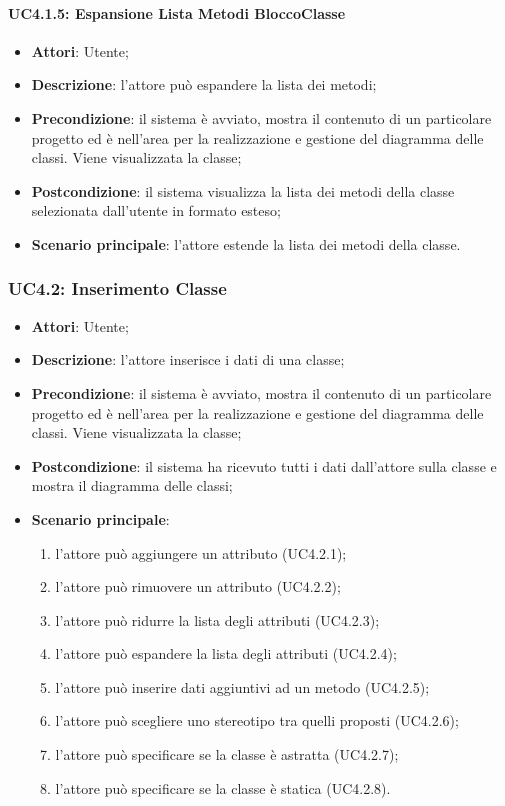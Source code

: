 \paragraph{UC4.1.5: Espansione Lista Metodi BloccoClasse}
\label{UC4.1.5}
\begin{itemize}
	\item \textbf{Attori}: Utente;
	\item \textbf{Descrizione}: l'attore può espandere la lista dei metodi;
	\item \textbf{Precondizione}: il sistema è avviato, mostra il contenuto di un particolare progetto ed è nell'area per la realizzazione e gestione del diagramma delle classi. Viene visualizzata la classe;
	\item \textbf{Postcondizione}: il sistema visualizza la lista dei metodi della classe selezionata dall'utente in formato esteso;
	\item \textbf{Scenario principale}: l'attore estende la lista dei metodi della classe.
\end{itemize}

\subsubsection{UC4.2: Inserimento Classe}
\label{UC4.2}
\begin{itemize}
	\item \textbf{Attori}: Utente;
	\item \textbf{Descrizione}: l'attore inserisce i dati di una classe;
	\item \textbf{Precondizione}: il sistema è avviato, mostra il contenuto di un particolare progetto ed è nell'area per la realizzazione e gestione del diagramma delle classi. Viene visualizzata la classe;
	\item \textbf{Postcondizione}: il sistema ha ricevuto tutti i dati dall'attore sulla classe e mostra il diagramma delle classi;
	\item \textbf{Scenario principale}:
	\begin{enumerate}
		\item l'attore può aggiungere un attributo (UC4.2.1);
		\item l'attore può rimuovere un attributo (UC4.2.2);
		\item l'attore può ridurre la lista degli attributi (UC4.2.3);
		\item l'attore può espandere la lista degli attributi (UC4.2.4);
		\item l'attore può inserire dati aggiuntivi ad un metodo (UC4.2.5);
		\item l'attore può scegliere uno stereotipo tra quelli proposti (UC4.2.6);%
		\item l'attore può specificare se la classe è astratta (UC4.2.7);
		\item l'attore può specificare se la classe è statica (UC4.2.8).
	\end{enumerate}
\end{itemize}

